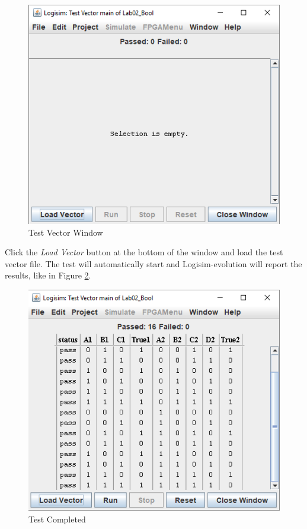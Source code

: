 \begin{figure}[H]
	\centering
	\includegraphics[width=\maxwidth{.95\linewidth}]{gfx/02-06}
	\caption{Test Vector Window}
	\label{fig:02-06}
\end{figure}

Click the \textit{Load Vector} button at the bottom of the window and load the test vector file. The test will automatically start and Logisim-evolution will report the results, like in Figure \ref{fig:02-07}.

\begin{figure}[H]
	\centering
	\includegraphics[width=\maxwidth{.95\linewidth}]{gfx/02-07}
	\caption{Test Completed}
	\label{fig:02-07}
\end{figure}

